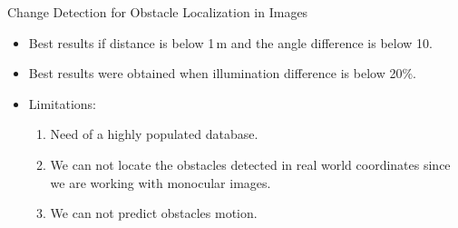 \begin{frame}{Change Detection for Obstacle Localization in Images}
  \begin{itemize}
   \item Best results if distance is below 1\,m and the angle difference is below 10\textdegree. 
   \item Best results were obtained when illumination difference is below 20\%.
   \item Limitations:
   \begin{enumerate}
    \item Need of a highly populated database. 
    \item We can not locate the obstacles detected in real world coordinates since we are working with monocular images.
    \item We can not predict obstacles motion.
   \end{enumerate}
  \end{itemize}
\end{frame}


